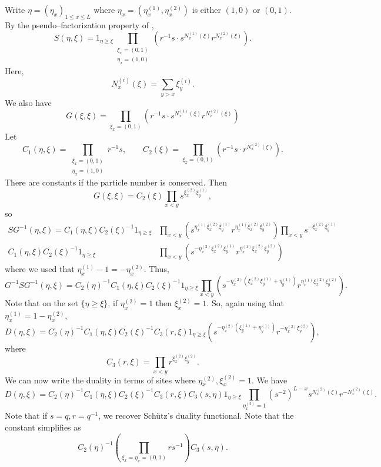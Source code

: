 \documentclass[12pt]{ximera}
\begin{document}
Write $\eta = (\eta_x)_{1 \leq x \leq L}$ where $\eta_x=(\eta_x^{(1)},\eta_x^{(2)})$ is either $(1,0)$ or $(0,1)$.
By the pseudo--factorization property of \cite{CGRS},
$$
S(\eta,\xi) = 1_{\eta \geq \xi} \prod_{\substack{ \xi_x = (0,1) \\ \eta_x=(1,0)}} \left( r^{-1}s \cdot s^{N_x^{(1)}(\xi)}r^{N_x^{(2)}(\xi)}\right).
$$
Here,
$$
N_x^{(i)}(\xi) = \sum_{y>x} \xi_y^{(i)}.
$$
We also have
$$
G(\xi,\xi) = \prod_{\xi_x=(0,1)} (r^{-1}s \cdot s^{N_x^{(1)}(\xi)}r^{N_x^{(2)}(\xi)}) 
$$
Let 
$$
C_1(\eta,\xi) =  \prod_{\substack{ \xi_x = (0,1) \\ \eta_x=(1,0)}} r^{-1}s, \quad \quad C_2(\xi) = \prod_{\xi_x=(0,1)} (r^{-1}s  \cdot r^{N_x^{(2)}(\xi)}) .
$$
There are constants if the particle number is conserved. Then 
$$
G(\xi,\xi) = C_2(\xi)\prod_{x<y} s^{\xi^{(2)}_x \xi^{(1)}_y},
$$
so
\begin{align*}
SG^{-1}(\eta,\xi) = C_1(\eta,\xi) C_2(\xi)^{-1}1_{\eta \geq \xi} & \prod_{x<y} (s^{\eta_x^{(1)} \xi_x^{(2)}\xi_y^{(1)}}r^{\eta_x^{(1)} \xi_x^{(2)}\xi_y^{(2)}} ) \prod_{x<y}s^{-\xi^{(2)}_x \xi^{(1)}_y}\\
C_1(\eta,\xi) C_2(\xi)^{-1}1_{\eta \geq \xi} &\prod_{x<y} (s^{-\eta_x^{(2)} \xi_x^{(2)}\xi_y^{(1)}}r^{\eta_x^{(1)} \xi_x^{(2)}\xi_y^{(2)}} )
\end{align*}
where we used that $\eta_x^{(1)}-1=-\eta_x^{(2)}$. Thus,
$$
G^{-1}SG^{-1}(\eta,\xi) = C_2(\eta)^{-1}C_1(\eta,\xi) C_2(\xi)^{-1} 1_{\eta \geq \xi}  \prod_{x<y} (s^{-\eta_x^{(2)}( \xi_x^{(2)}\xi_y^{(1)} +  \eta_y^{(1)} )}r^{\eta_x^{(1)} \xi_x^{(2)}\xi_y^{(2)}} ).
$$
Note that on the set $\{\eta \geq \xi\}$, if $\eta_x^{(2)}=1$ then $\xi_x^{(2)}=1$. So, again using that $\eta^{(1)}_x = 1 - \eta_x^{(2)}$,
$$
D(\eta,\xi) = C_2(\eta)^{-1}C_1(\eta,\xi) C_2(\xi)^{-1} C_3(r,\xi) 1_{\eta \geq \xi}  (s^{-\eta_x^{(2)}( \xi_y^{(1)} +  \eta_y^{(1)} )}r^{-\eta_x^{(2)} \xi_y^{(2)}} ),
$$
where 
$$
C_3(r,\xi) = \prod_{x<y} r^{\xi_x^{(2)}\xi_y^{(2)}}.
$$
We can now write the duality in terms of sites where $\eta_x^{(2)},\xi_x^{(2)}=1$. We have
$$
D(\eta,\xi) =  C_2(\eta)^{-1}C_1(\eta,\xi) C_2(\xi)^{-1} C_3(r,\xi) C_3(s,\eta) 1_{\eta \geq \xi} \prod_{\eta_x^{(2)}=1} (s^{-2})^{L-x} s^{N_x^{(2)}(\xi)}r^{-N_x^{(2)}(\xi)}.
$$
Note that if $s=q,r=q^{-1}$, we recover Sch\"{u}tz's duality functional. Note that the constant simplifies as
$$
C_2(\eta)^{-1} \left( \prod_{\xi_x=\eta_x=(0,1)} rs^{-1} \right)  C_3(s,\eta). 
$$


\end{document}
